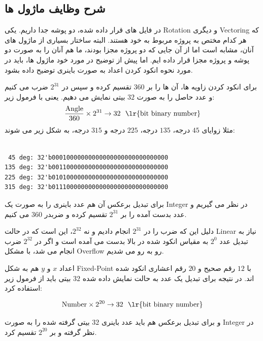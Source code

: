 \documentclass[12pt,titlepage,a4page , tikz , multi,table , svgnames,xcdraw]{article}
\begin{document}
\begin{landscape}
\thispagestyle{empty}


\end{landscape}


\subsection{شرح وظایف ماژول ها}

در فایل های قرار داده شده، دو پوشه جدا داریم. یکی Rotation و دیگری Vectoring که هر کدام مختص به پروژه مربوط به خود هستند. البته ساختار بسیاری از ماژول های آنان، مشابه است اما از آن جایی که دو پروژه مجزا بودند، ما هم آنان را به صورت دو پوشه و پروژه مجزا قرار داده ایم. اما پیش از توضیح در مورد خود ماژول ها، باید در مورد نحوه انکود کردن اعداد به صورت باینری توضیح داده بشود.

برای انکود کردن زاویه ها، آن ها را بر $360$ تقسیم کرده و سپس در $2^{31}$ ضرب می کنیم و عدد حاصل را به صورت $32$ بیتی نمایش می دهیم. یعنی با فرمول زیر:
$$\frac{\text{Angle}}{360} \times 2^{31} \rightarrow 32 ~~\text{\lr{bit binary number}}$$
 مثلا زوایای $45$ درجه، $135$ درجه، $225$ درجه و $315$ درجه، به شکل زیر می شوند:

\begin{latin}
\begin{verbatim}

 45 deg: 32'b00010000000000000000000000000000
135 deg: 32'b00110000000000000000000000000000
225 deg: 32'b01010000000000000000000000000000
315 deg: 32'b01110000000000000000000000000000

\end{verbatim}
\end{latin} 

برای تبدیل برعکس آن هم عدد باینری را به صورت یک Integer در نظر می گیریم و عدد بدست آمده را بر $2^{31}$ تقسیم کرده و ضربدر $360$ می کنیم.


دلیل این که ضرب را در $2^{31}$ انجام دادیم و نه $2^{32}$، این است که در حالت Linear نیاز به  تبدیل عدد $2^{0}$ به مقیاس انکود شده در بالا بدست می آمده است و اگر در $2^{32}$ ضرب انجام می شد، با مشکل Overflow رو به رو می شدیم.

اعداد $x$ و $y$ هم به شکل Fixed-Point با $12$ رقم صحیح و $20$ رقم اعشاری انکود شده اند. در نتیجه برای تبدیل یک عدد به حالت نمایش داده شده $32$ بیتی باید از فرمول زیر استفاده کرد:

$$\text{Number} \times 2^{20} \rightarrow 32 ~~\text{\lr{bit binary number}}$$

و برای تبدیل برعکس هم باید عدد باینری $32$ بیتی گرفته شده را به صورت Integer در نظر گرفته و بر $2^{20}$ تقسیم کرد.
\end{document}

